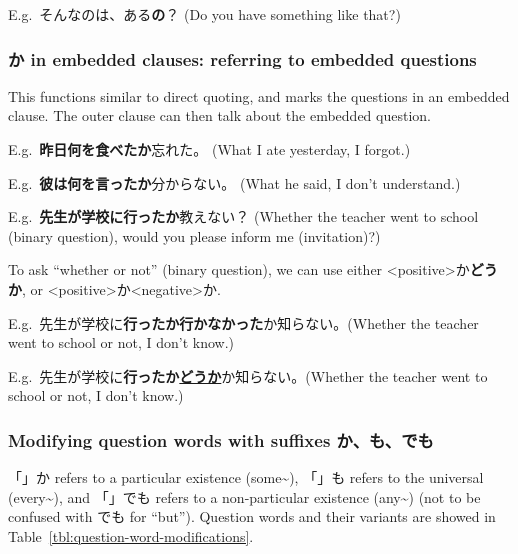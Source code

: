 \documentclass[../nihongo-gakushuu-kyouzai.tex]{subfiles}
\begin{document}
E.g.\ そんなのは、ある\textbf{の}？ (Do you have something like that?)

\subsubsection{か in embedded clauses: referring to embedded questions} \label{sec:ka-question-embedded-clauses}
This functions similar to direct quoting, and marks the questions in an embedded clause. The outer clause can then talk about the embedded question.

E.g.\ \textbf{昨日何を食べたか}忘れた。 (What I ate yesterday, I forgot.)

E.g.\ \textbf{彼は何を言ったか}分からない。 (What he said, I don't understand.)

E.g.\ \textbf{先生が学校に行ったか}教えない？ (Whether the teacher went to school (binary question), would you please inform me (invitation)?)

To ask ``whether or not'' (binary question), we can use either <positive>か\textbf{どうか}, or <positive>か<negative>か.

E.g.\ 先生が学校に\textbf{行ったか行かなかった}か知らない。(Whether the teacher went to school or not, I don't know.)

E.g.\ 先生が学校に\textbf{行ったか\ul{どうか}}か知らない。(Whether the teacher went to school or not, I don't know.)


\subsubsection{Modifying question words with suffixes か、も、でも}
「」か refers to a particular existence (some\textasciitilde), 「」も refers to the universal (every\textasciitilde), and 「」でも refers to a non-particular existence (any\textasciitilde) (not to be confused with でも for ``but''). Question words and their variants are showed in Table~\ref{tbl:question-word-modifications}.
\end{document}
